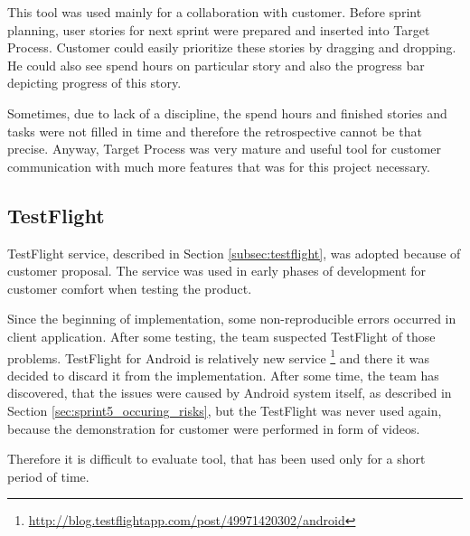 This tool was used mainly for a collaboration with customer. 
Before sprint planning, user stories for next sprint were prepared and inserted into Target Process.
Customer could easily prioritize these stories by dragging and dropping.
He could also see spend hours on particular story and also the progress bar depicting progress of this story.

Sometimes, due to lack of a discipline, the spend hours and finished stories and tasks were not filled in time and therefore the retrospective cannot be that precise.
Anyway, Target Process was very mature and useful tool for customer communication with much more features that was for this project necessary.


\subsection{TestFlight}
TestFlight service, described in Section \ref{subsec:testflight}, was adopted because of customer proposal.
The service was used in early phases of development for customer comfort when testing the product.

Since the beginning of implementation, some non-reproducible errors occurred in client application.
After some testing, the team suspected TestFlight of those problems.
TestFlight for Android is relatively new service \footnote{\url{http://blog.testflightapp.com/post/49971420302/android}} and there it was decided to discard it from the implementation.
After some time, the team has discovered, that the issues were caused by Android system itself, as described in Section \ref{sec:sprint5_occuring_risks}, but the TestFlight was never used again, because the demonstration for customer were performed in form of videos.
 
Therefore it is difficult to evaluate tool, that has been used only for a short period of time.

